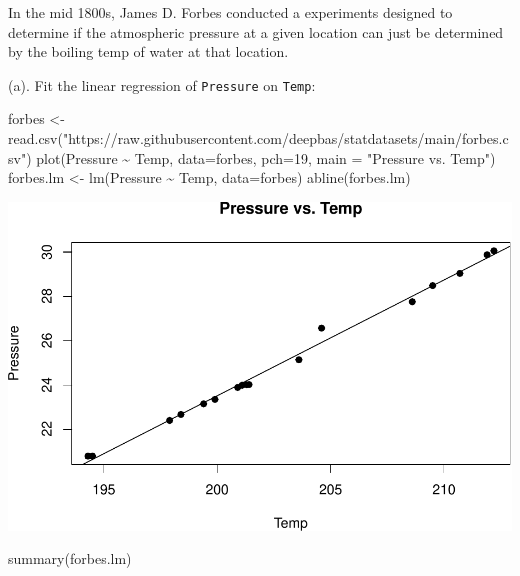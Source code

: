 \documentclass[
]{book}
\newenvironment{Shaded}{\begin{snugshade}}{\end{snugshade}}
\newcommand{\AttributeTok}[1]{\textcolor[rgb]{0.77,0.63,0.00}{#1}}
\newcommand{\DecValTok}[1]{\textcolor[rgb]{0.00,0.00,0.81}{#1}}
\newcommand{\FunctionTok}[1]{\textcolor[rgb]{0.00,0.00,0.00}{#1}}
\newcommand{\NormalTok}[1]{#1}
\newcommand{\OtherTok}[1]{\textcolor[rgb]{0.56,0.35,0.01}{#1}}
\newcommand{\SpecialCharTok}[1]{\textcolor[rgb]{0.00,0.00,0.00}{#1}}
\newcommand{\StringTok}[1]{\textcolor[rgb]{0.31,0.60,0.02}{#1}}
\begin{document}
In the mid 1800s, James D. Forbes conducted a experiments designed to determine if the atmospheric pressure at a given location can just be determined by the boiling temp of water at that location.

(a). Fit the linear regression of \texttt{Pressure} on \texttt{Temp}:

\begin{Shaded}
\begin{Highlighting}[]
\NormalTok{forbes }\OtherTok{\textless{}{-}}  \FunctionTok{read.csv}\NormalTok{(}\StringTok{"https://raw.githubusercontent.com/deepbas/statdatasets/main/forbes.csv"}\NormalTok{)}
\FunctionTok{plot}\NormalTok{(Pressure }\SpecialCharTok{\textasciitilde{}}\NormalTok{ Temp, }\AttributeTok{data=}\NormalTok{forbes, }\AttributeTok{pch=}\DecValTok{19}\NormalTok{, }\AttributeTok{main =} \StringTok{"Pressure vs. Temp"}\NormalTok{)}
\NormalTok{forbes.lm }\OtherTok{\textless{}{-}} \FunctionTok{lm}\NormalTok{(Pressure }\SpecialCharTok{\textasciitilde{}}\NormalTok{ Temp, }\AttributeTok{data=}\NormalTok{forbes)}
\FunctionTok{abline}\NormalTok{(forbes.lm)}
\end{Highlighting}
\end{Shaded}

\includegraphics[width=1\linewidth]{Class_Activity_6_files/figure-latex/unnamed-chunk-29-1}

\begin{Shaded}
\begin{Highlighting}[]
\FunctionTok{summary}\NormalTok{(forbes.lm)}
\end{Highlighting}
\end{Shaded}
\end{document}
